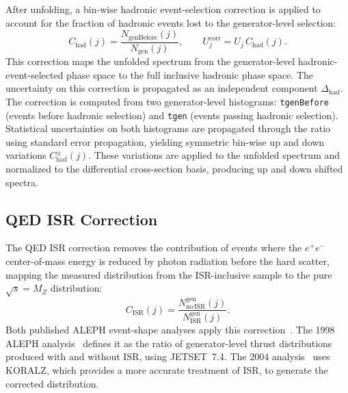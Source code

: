 After unfolding, a bin-wise hadronic event-selection correction is applied to account for the fraction of hadronic events lost to the generator-level selection:
\begin{equation}
C_{\mathrm{had}}(j) = \frac{N_{\mathrm{genBefore}}(j)}{N_{\mathrm{gen}}(j)},
\qquad
U_j^{\mathrm{corr}} = U_j\,C_{\mathrm{had}}(j).
\end{equation}
This correction maps the unfolded spectrum from the generator-level hadronic-event-selected phase space to the full inclusive hadronic phase space. The uncertainty on this correction is propagated as an independent component
$\Delta_{\mathrm{had}}$. The correction is computed from two generator-level histograms: \texttt{tgenBefore} (events before hadronic selection) and \texttt{tgen} (events passing hadronic selection). Statistical uncertainties on both histograms are propagated through the ratio using standard error propagation, yielding symmetric bin-wise up and down variations $C_{\mathrm{had}}^{\pm}(j)$. These variations are applied to the unfolded spectrum and normalized to the differential cross-section basis, producing up and down shifted spectra. 


\subsection{QED ISR Correction}
\label{sec:isr_uncertainty}

The QED ISR correction removes the contribution of events
where the $e^+e^-$ center-of-mass energy is reduced by photon radiation before the hard scatter, mapping the measured distribution from the ISR-inclusive sample
to the pure $\sqrt{s}=M_Z$ distribution:
\begin{equation}
C_{\mathrm{ISR}}(j) = \frac{N^{\mathrm{gen}}_{\mathrm{no\,ISR}}(j)}{N^{\mathrm{gen}}_{\mathrm{ISR}}(j)}.
\end{equation}
Both published ALEPH event-shape analyses apply this
correction~\cite{Barate:1996fi,Heister:2003aj}. The 1998 ALEPH analysis~\cite{Barate:1996fi} defines it as the ratio of generator-level thrust distributions produced with and without ISR, using \textsc{JETSET}~7.4. The 2004 analysis~\cite{Heister:2003aj} uses \textsc{KORALZ}, which provides a more accurate treatment of ISR, to generate the corrected distribution.


